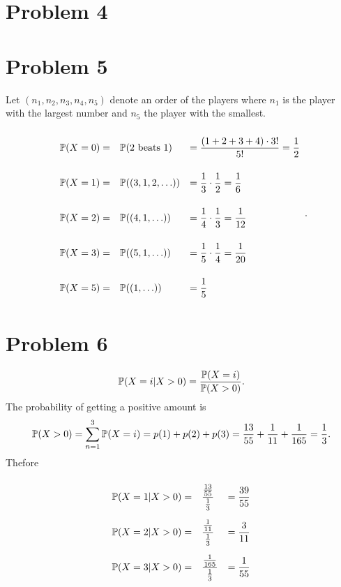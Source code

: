 \documentclass[12pt]{extarticle}
\begin{document}
\section*{Problem 4}

\begin{figure}[h!]
	\centering
	
\end{figure}

\section*{Problem 5}
Let $(n_1, n_2, n_3, n_4, n_5)$ denote an order of the players where $n_1$ is the player with the largest number and $n_5$ the player with the smallest.
\[
	\everymath{\displaystyle}
	\renewcommand\arraystretch{3}
	\begin{array}{rll}
		\Prob{X = 0} =& \Prob{2\text{ beats }1} &= \frac{(1+2+3+4)\cdot 3!}{5!} = \frac{1}{2} \\
		\Prob{X = 1} =& \Prob{(3,1,2,\ldots)} &= \frac{1}{3}\cdot\frac{1}{2} = \frac{1}{6} \\
		\Prob{X = 2} =& \Prob{(4,1,\ldots)} &= \frac{1}{4}\cdot\frac{1}{3} = \frac{1}{12} \\
		\Prob{X = 3} =& \Prob{(5,1,\ldots)} &= \frac{1}{5}\cdot\frac{1}{4} = \frac{1}{20} \\
		\Prob{X = 5} =& \Prob{(1,\ldots)} &= \frac{1}{5}
	\end{array}
.\]

\section*{Problem 6}
\[
	\mathbb{P}\qty(X = i | X > 0) = \frac{\mathbb{P}\qty(X = i)}{\mathbb{P}\qty(X > 0)}
.\]
The probability of getting a positive amount is
\[
	\mathbb{P}\qty(X > 0) =  \sum_{n=1}^{3} \mathbb{P}\qty(X = i) = p(1) + p(2) + p(3) = \frac{13}{55} + \frac{1}{11} + \frac{1}{165} = \frac{1}{3}
.\]
Thefore
\[
	\everymath{\displaystyle}
	\renewcommand\arraystretch{3}
	\begin{array}{rll}
		\Prob{X = 1 | X > 0} =& \frac{\frac{13}{55}}{\frac{1}{3}} &= \frac{39}{55} \\
		\Prob{X = 2 | X > 0} =& \frac{\frac{1}{11}}{\frac{1}{3}} &= \frac{3}{11} \\
		\Prob{X = 3 | X > 0} =& \frac{\frac{1}{165}}{\frac{1}{3}} &= \frac{1}{55} \\
	\end{array}
\]
\end{document}
